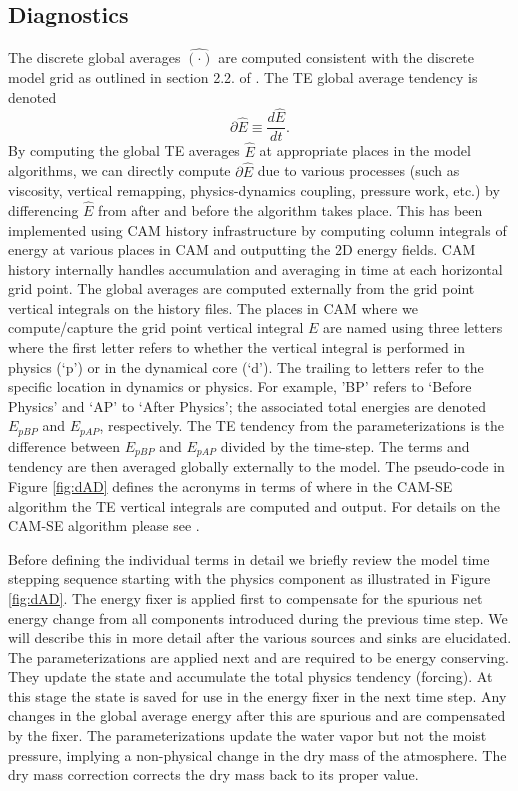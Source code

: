\documentclass{agujournal}
\newcommand*{\gi}[1]{\widehat{#1}}
\begin{document}
\subsection{Diagnostics}\label{sec:diagnostics}
The discrete global averages $\gi{(\cdot)}$ are computed consistent with the discrete model grid as outlined in section 2.2. of \citet{LBDL2014JAMES}. The TE global average tendency is denoted
\begin{equation}
\partial \gi{E}\equiv \frac{d\gi{E}}{dt}.
\end{equation}
By computing the global TE averages $\gi{E}$ at appropriate places in the model algorithms, we can directly compute $\partial \gi{E}$ due to various processes (such as viscosity, vertical remapping, physics-dynamics coupling, pressure work, etc.) by differencing $\gi{E}$ from after and before the algorithm takes place. This has been implemented using CAM history infrastructure by computing column integrals of energy at various places in CAM and outputting the 2D energy fields. CAM history internally handles accumulation and averaging in time at each horizontal grid point. The global averages are computed externally from the grid point vertical integrals on the history files. The places in CAM where we compute/capture the grid point vertical integral $E$ are named using three letters where the first letter refers to whether the vertical integral is performed in physics (`p') or in the dynamical core (`d'). The trailing to letters refer to the specific location in dynamics or physics. For example, 'BP' refers to `Before Physics' and `AP' to `After Physics'; the associated total energies are denoted ${E}_{pBP}$ and ${E}_{pAP}$, respectively. The TE tendency from the parameterizations is the difference between ${E}_{pBP}$ and ${E}_{pAP}$ divided by the time-step. The terms and tendency are then averaged globally externally to the model. The pseudo-code in Figure \ref{fig:dAD} defines the acronyms in terms of where in the CAM-SE algorithm the TE vertical integrals are computed and output. For details on the CAM-SE algorithm please see \citet{LetAl2018JAMES}.

Before defining the individual terms in detail we briefly review the model time stepping sequence starting with the physics component as illustrated in Figure \ref{fig:dAD}. The energy fixer is applied first to compensate for the spurious net energy change from all components introduced during the previous time step. We will describe this in more detail after the various sources and sinks are elucidated. The parameterizations are applied next and are required to be energy conserving. They update the state and accumulate the total physics tendency (forcing). At this stage the state is saved for use in the energy fixer in the next time step. Any changes in the global average energy after this are spurious and are compensated by the fixer. The parameterizations update the water vapor but not the moist pressure, implying a non-physical change in the dry mass of the atmosphere. The dry mass correction corrects the dry mass back to its proper value.
\end{document}
